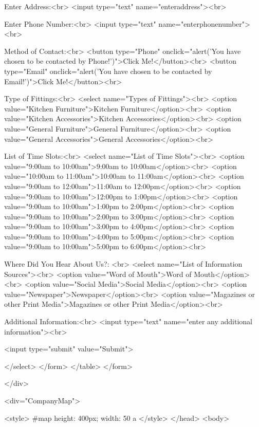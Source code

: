 	 Enter Address:<br>
     <input type="text" name="enteraddress"><br>
	 
	 Enter Phone Number:<br>
     <input type="text" name="enterphonenumber"><br>
	 
	 
	 Method of Contact:<br> 
	 <button type="Phone" onclick="alert('You have chosen to be contacted by Phone!')">Click Me!</button><br> 
	 <button type="Email" onclick="alert('You have chosen to be contacted by Email!')">Click Me!</button><br> 
	 
	 Type of Fittings:<br> 
	 <select name="Types of Fittings"><br>
     <option value="Kitchen Furniture">Kitchen Furniture</option><br>
     <option value="Kitchen Accessories">Kitchen Accessories</option><br>
     <option value="General Furniture">General Furniture</option><br>
     <option value="General Accessories">General Accessories</option><br> 

	 List of Time Slots:<br> 
	 <select name="List of Time Slots"><br>
	 <option value="9:00am to 10:00am">9:00am to 10:00am</option><br> 
	 <option value="10:00am to 11:00am">10:00am to 11:00am</option><br>
	 <option value="9:00am to 12:00am">11:00am to 12:00pm</option><br>
     <option value="9:00am to 10:00am">12:00pm to 1:00pm</option><br> 
     <option value="9:00am to 10:00am">1:00pm to 2:00pm</option><br> 
	 <option value="9:00am to 10:00am">2:00pm to 3:00pm</option><br> 
	 <option value="9:00am to 10:00am">3:00pm to 4:00pm</option><br> 
	 <option value="9:00am to 10:00am">4:00pm to 5:00pm</option><br> 
     <option value="9:00am to 10:00am">5:00pm to 6:00pm</option><br> 
	 
	 Where Did You Hear About Us?: <br> 
	 <select name="List of Information Sources"><br> 
     <option value="Word of Mouth">Word of Mouth</option><br> 
	 <option value="Social Media">Social Media</option><br> 
	 <option value="Newspaper">Newspaper</option><br> 
	 <option value="Magazines or other Print Media">Magazines or other Print Media</option><br> 
	 
     Additional Information:<br> 
	 <input type="text" name="enter any additional information"><br> 
	 
	 <input type="submit" value="Submit">
	 
</select> 
</form> 
</table> 
</form> 


</div> 

<div="CompanyMap"> 

<style>
       #map {
        height: 400px;
        width: 50%
        a
	   }
    </style>
  </head>
  <body>
    
